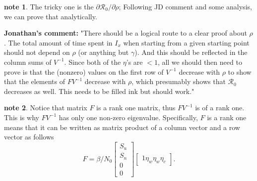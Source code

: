 \documentclass[12pt]{article}
\newcommand{\Rnum}{\mathcal{R}_0}
\theoremstyle{definition} %
\newtheorem{note}{note}
\begin{document}
\begin{note} The tricky one is the $\partial{\Rnum}/\partial{\rho}$; Following JD comment and some analysis, we can prove that analytically.
\end{note}

{\bf Jonathan's comment:} "There should be a logical route to a clear proof about $\rho$. The total
amount of time spent in $I_x$ when starting from a given starting point should not depend on $\rho$ (or anything but $\gamma$). And this should be reflected in the column sums of $V^{-1}$.
Since both of the $\eta$'s are $<1$, all we should then need to prove is that the (nonzero) values on the first row of $V^{-1}$ decrease with $\rho$ to show that the elements of $FV^{-1}$ decrease with $\rho$, which presumably shows that $\Rnum$ decreases as well. This needs to be filled ink but should work."

\begin{note}
\label{note:rankf}
Notice that matrix $F$ is a rank one matrix, thus $FV^{-1}$ is of a rank one. This is why $FV^{-1}$ has only one non-zero eigenvalue. Specifically, $F$ is a rank one means that it can be written as matrix product of a column vector and a row vector as follows
$$
F = \beta/N_0 \left[\begin{array}{c} S_u\\  S_n\\ 0\\ 0 \end {array} \right]
\left[\begin{array}{cccc} 1 \eta_w \eta_w \eta_c \end {array} \right].
$$
\end{note}
\end{document}
